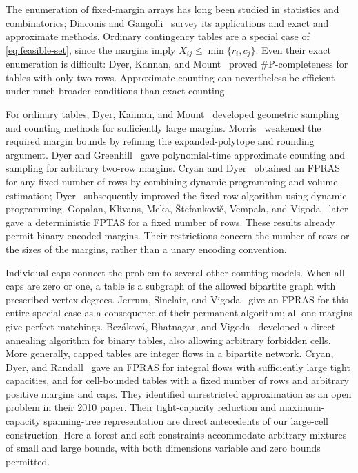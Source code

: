 The enumeration of fixed-margin arrays has long been studied in
statistics and combinatorics; Diaconis and Gangolli~\cite{DG1995}
survey its applications and exact and approximate methods.
Ordinary contingency tables are a special case of
\eqref{eq:feasible-set}, since the margins imply
$X_{ij}\le\min\{r_i,c_j\}$. Even their exact enumeration is difficult:
Dyer, Kannan, and Mount~\cite[Theorem~1]{DKM1997} proved
$\#\mathrm P$-completeness for tables with only two rows.
Approximate counting can nevertheless be efficient under much broader
conditions than exact counting.

For ordinary tables, Dyer, Kannan, and Mount~\cite{DKM1997}
developed geometric sampling and counting methods for sufficiently
large margins. Morris~\cite{Morris2002} weakened the required margin
bounds by refining the expanded-polytope and rounding argument.
Dyer and Greenhill~\cite{DG2000} gave polynomial-time approximate
counting and sampling for arbitrary two-row margins. Cryan and
Dyer~\cite{CD2003} obtained an FPRAS for any fixed number of rows by
combining dynamic programming and volume estimation; Dyer~\cite{Dyer2003}
subsequently improved the fixed-row algorithm using dynamic programming.
Gopalan, Klivans, Meka, \v{S}tefankovi\v{c}, Vempala, and
Vigoda~\cite[Theorem~1.3]{GKM2011} later gave a deterministic FPTAS
for a fixed number of rows.
These results already permit binary-encoded margins. Their restrictions
concern the number of rows or the sizes of the margins, rather than a
unary encoding convention.

Individual caps connect the problem to several other counting models.
When all caps are zero or one, a table is a subgraph of the allowed
bipartite graph with prescribed vertex degrees. Jerrum, Sinclair, and
Vigoda~\cite[Corollary~8.1]{JSV2004} give an FPRAS for this entire
special case as a consequence of their permanent algorithm; all-one
margins give perfect matchings. Bez\'akov\'a, Bhatnagar, and
Vigoda~\cite{BBV2007} developed a direct annealing algorithm for
binary tables, also allowing arbitrary forbidden cells.
More generally, capped tables are
integer flows in a bipartite network. Cryan, Dyer, and
Randall~\cite{CDR2010} gave an FPRAS for integral flows with sufficiently
large tight capacities, and for cell-bounded tables with a fixed number
of rows and arbitrary positive margins and caps. They identified
unrestricted approximation as an open problem in their 2010 paper.
Their tight-capacity reduction and maximum-capacity spanning-tree
representation are direct antecedents of our large-cell construction.
Here a forest and soft constraints accommodate arbitrary mixtures of
small and large bounds, with both dimensions variable and zero bounds
permitted.

